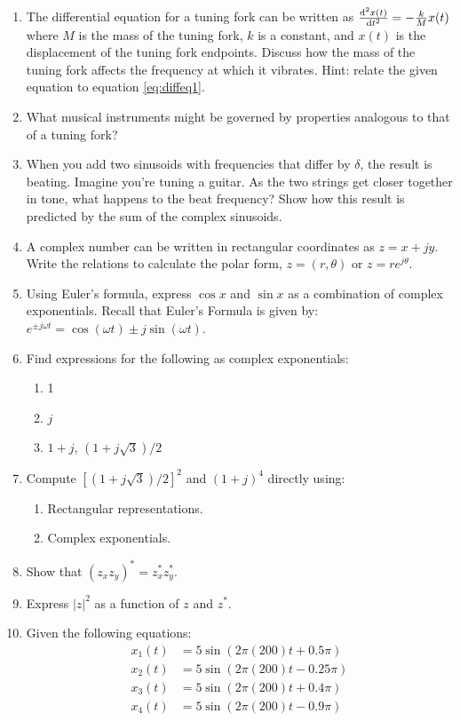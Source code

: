 \begin{enumerate}
\item The differential equation for a tuning fork can be written as $\frac{\mathrm{d}^{2} x(t)}{\mathrm{d} t^{2}} = -\frac{k}{M} x(t) $ where $M$ is the mass of the tuning fork, $k$ is a constant, and $x(t)$ is the displacement of the tuning fork endpoints. Discuss how the mass of the tuning fork affects the frequency at which it vibrates. Hint: relate the given equation to equation \ref{eq:diffeq1}.
\item What musical instruments might be governed by properties
  analogous to that of a tuning fork? 
\item When you add two sinusoids with frequencies that differ by
  $\delta$, the result is beating. Imagine you're tuning a guitar.  As
  the two strings get closer together in tone, what happens to the
  beat frequency? Show how this result is predicted by the sum of the
  complex sinusoids.
\item A complex number can be written in rectangular coordinates as $z
  = x + j y$. Write the relations to calculate the polar form, $z=(r,
  \theta)$ or $z = r e^{j\theta}$.

\item Using Euler's formula, express $\cos x$ and $\sin x$ as a
  combination of complex exponentials. Recall that Euler's Formula is given by: $e^{\pm j\omega t}=\cos(\omega t) \pm j \sin(\omega t)$.

\item Find expressions for the following as complex exponentials:
	\begin{enumerate}
	\item1 
	\item $j$
	\item $1 + j$, $(1 + j\sqrt{3})/2$
	\end{enumerate}

\item Compute $[(1+j\sqrt{3})/2]^2$ and $(1+j)^4$ directly using: 
  \begin{enumerate}
  \item Rectangular representations.
  \item Complex exponentials.
  \end{enumerate}

\item Show that $(z_xz_y)^* = z_x^* z_y^*$.


\item Express $|z|^2$ as a function of $z$ and $z^*$.


\item Given the following equations:
\begin{align*}
x_1(t) &= 5 \sin(2\pi(200)t +0.5\pi) \\
x_2(t) &= 5 \sin(2\pi(200)t - 0.25\pi) \\
x_3(t) &= 5 \sin(2\pi(200)t +0.4\pi) \\
x_4(t) &= 5 \sin(2\pi(200)t - 0.9\pi) 
\end{align*}


\end{enumerate}
